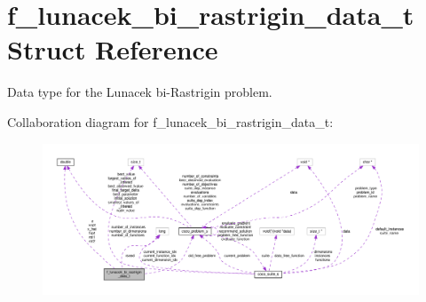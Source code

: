 \hypertarget{structf__lunacek__bi__rastrigin__data__t}{}\section{f\+\_\+lunacek\+\_\+bi\+\_\+rastrigin\+\_\+data\+\_\+t Struct Reference}
\label{structf__lunacek__bi__rastrigin__data__t}


Data type for the Lunacek bi-\/\+Rastrigin problem.  




Collaboration diagram for f\+\_\+lunacek\+\_\+bi\+\_\+rastrigin\+\_\+data\+\_\+t\+:\nopagebreak
\begin{figure}[H]
\begin{center}
\leavevmode
\includegraphics[width=350pt]{structf__lunacek__bi__rastrigin__data__t__coll__graph}
\end{center}
\end{figure}
